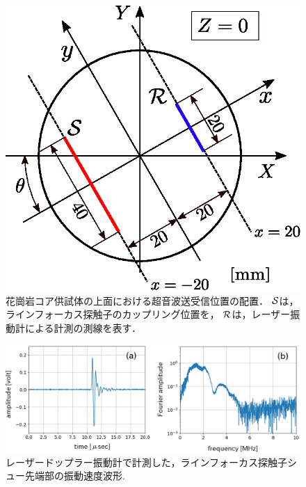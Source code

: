 \begin{figure}[h]
	\begin{center}
	\includegraphics[width=0.5\linewidth]{Figs/fig4.eps} 
	\end{center}
	\caption{
		花崗岩コア供試体の上面における超音波送受信位置の配置．
		${\cal S}$は，ラインフォーカス探触子のカップリング位置を，
		${\cal R}$は，レーザー振動計による計測の測線を表す．
	} 
	\label{fig:fig4}
\end{figure}
\begin{figure}[h]
	\begin{center}
	\includegraphics[width=0.9\linewidth]{Figs/fig5.eps} 
	\end{center}
	\caption{
		レーザードップラー振動計で計測した，ラインフォーカス探触子シュー先端部の振動速度波形.
	} 
	\label{fig:fig5}
\end{figure}
